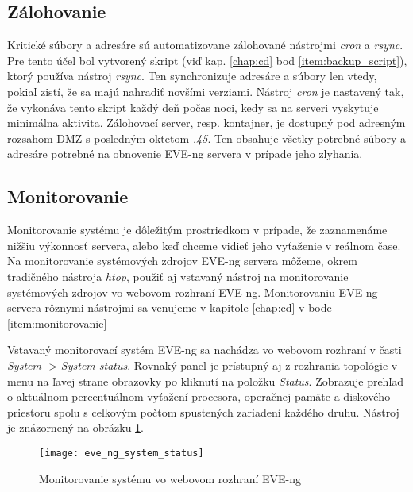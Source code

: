 \subsection{Zálohovanie}
\label{chap:zalohovanie}

Kritické súbory a adresáre sú automatizovane zálohované nástrojmi \emph{cron} a \emph{rsync}. Pre tento účel bol vytvorený skript (viď kap. \ref{chap:cd} bod \ref{item:backup_script}), ktorý používa nástroj \emph{rsync}. Ten synchronizuje adresáre a súbory len vtedy, pokiaľ zistí, že sa majú nahradiť novšími verziami. Nástroj \emph{cron} je nastavený tak, že vykonáva tento skript každý deň počas noci, kedy sa na serveri vyskytuje minimálna aktivita. Zálohovací server, resp. kontajner, je dostupný pod adresným rozsahom DMZ s posledným oktetom \emph{.45}. Ten obsahuje všetky potrebné súbory a adresáre potrebné na obnovenie EVE-ng servera v prípade jeho zlyhania.





\subsection{Monitorovanie}

Monitorovanie systému je dôležitým prostriedkom v prípade, že zaznamenáme nižšiu výkonnosť servera, alebo keď chceme vidieť jeho vyťaženie v reálnom čase. Na monitorovanie systémových zdrojov EVE-ng servera môžeme, okrem tradičného nástroja \emph{htop}, použiť aj vstavaný nástroj na monitorovanie systémových zdrojov vo webovom rozhraní EVE-ng. Monitorovaniu EVE-ng servera rôznymi nástrojmi sa venujeme v kapitole \ref{chap:cd} v bode \ref{item:monitorovanie}

Vstavaný monitorovací systém EVE-ng sa nachádza vo webovom rozhraní v časti \emph{System} -> \emph{System status}. Rovnaký panel je prístupný aj z rozhrania topológie v menu na ľavej strane obrazovky po kliknutí na položku \emph{Status}. Zobrazuje prehľad o aktuálnom percentuálnom vyťažení procesora, operačnej pamäte a diskového priestoru spolu s celkovým počtom spustených zariadení každého druhu. Nástroj je znázornený na obrázku \ref{obr:eve_ng_system_status}.

\begin{figure}
    \centering
    \texttt{[image: eve\_ng\_system\_status]}
    \caption{Monitorovanie systému vo webovom rozhraní EVE-ng}
    \label{obr:eve_ng_system_status}
\end{figure}






